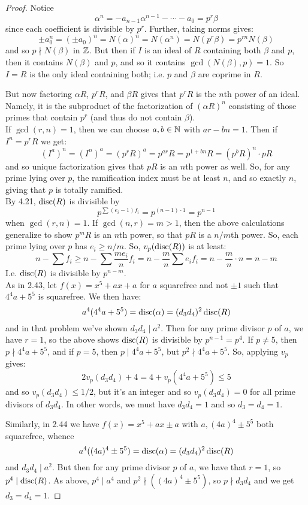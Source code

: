 \begin{proof}
	Notice
	\[ \alpha^n = -a_{n-1}\alpha^{n-1} - \cdots - a_0 = p^r\beta \]
	since each coefficient is divisible by $p^r$. Further, taking norms gives:
	\[ \pm a_0^n = (\pm a_0)^n = N(\alpha)^n = N(\alpha^n) = N(p^r\beta) = p^{rn}N(\beta) \]
	and so $p \nmid N(\beta)$ in $\mathbb{Z}$. But then if $I$ is an ideal of $R$ containing both $\beta$ and $p$, then it contains $N(\beta)$ and $p$, and so it contains $\gcd(N(\beta),p) = 1$. So $I=R$ is the only ideal containing both; i.e. $p$ and $\beta$ are coprime in $R$.
	
	But now factoring $\alpha R$, $p^rR$, and $\beta R$ gives that $p^rR$ is the $n$th power of an ideal. Namely, it is the subproduct of the factorization of $(\alpha R)^n$ consisting of those primes that contain $p^r$ (and thus do not contain $\beta$). \\
	
	If $\gcd(r,n)=1$, then we can choose $a,b \in \mathbb{N}$ with $ar-bn = 1$. Then if $I^n = p^rR$ we get:
	\[ (I^a)^n = (I^n)^a = (p^rR)^a = p^{ar}R = p^{1+bn}R = (p^bR)^n \cdot pR \]
	and so unique factorization gives that $pR$ is an $n$th power as well. So, for any prime lying over $p$, the ramification index must be at least $n$, and so exactly $n$, giving that $p$ is totally ramified. \\
	
	By 4.21, $\operatorname{disc}(R)$ is divisible by
	\[ p^{\sum (e_i-1)f_i} = p^{(n-1) \cdot 1} = p^{n-1} \]
	when $\gcd(r,n)=1$. If $\gcd(n,r)=m > 1$, then the above calculations generalize to show $p^mR$ is an $n$th power, so that $pR$ is a $n/m$th power. So, each prime lying over $p$ has $e_i \geq n/m$. So, $v_p(\operatorname{disc}(R))$ is at least:
	\[ n - \sum f_i \geq n - \sum \frac{me_i}{n}f_i = n - \frac{m}{n}\sum e_if_i = n - \frac{m}{n} \cdot n = n-m \]
	I.e. $\operatorname{disc}(R)$ is divisible by $p^{n-m}$. \\
	
	As in 2.43, let $f(x) = x^5 + ax + a$ for $a$ squarefree and not $\pm 1$ such that $4^4a+5^5$ is squarefree. We then have:
	\[ a^4(4^4a+5^5) = \operatorname{disc}(\alpha) = (d_3d_4)^2\operatorname{disc}(R) \]
	and in that problem we've shown $d_3d_4 \mid a^2$. Then for any prime divisor $p$ of $a$, we have $r = 1$, so the above shows $\operatorname{disc}(R)$ is divisible by $p^{n-1} = p^4$. If $p \neq 5$, then $p \nmid 4^4a+5^5$, and if $p=5$, then $p \mid 4^4a+5^5$, but $p^2 \nmid 4^4a+5^5$. So, applying $v_p$ gives:
	\[ 2v_p(d_3d_4) + 4 = 4+v_p(4^4a+5^5) \leq 5 \]
	and so $v_p(d_3d_4) \leq 1/2$, but it's an integer and so $v_p(d_3d_4) = 0$ for all prime divisors of $d_3d_4$. In other words, we must have $d_3d_4 = 1$ and so $d_3=d_4=1$.
	
	Similarly, in 2.44 we have $f(x) = x^5 + ax \pm a$ with $a,(4a)^4 \pm 5^5$ both squarefree, whence
	\[ a^4((4a)^4 \pm 5^5) = \operatorname{disc}(\alpha) = (d_3d_4)^2\operatorname{disc}(R) \]
	and $d_3d_4 \mid a^2$. But then for any prime divisor $p$ of $a$, we have that $r=1$, so $p^4 \mid \operatorname{disc}(R)$. As above, $p^4 \mid a^4$ and $p^2 \nmid ((4a)^4 \pm 5^5)$, so $p \nmid d_3d_4$ and we get $d_3=d_4=1$.
\end{proof}

